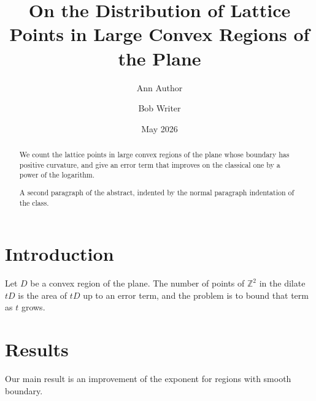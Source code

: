 \documentclass{amsart}
\begin{document}
\title{On the Distribution of Lattice Points in Large Convex Regions of the Plane}
\author{Ann Author}
\address{Department of Mathematics, Some University \\ Some City}
\author{Bob Writer}
\address{Institute for Advanced Things, a Very Long Name of an Institute That Goes On and On Past the End of a Line}
\date{May 2026}

\begin{abstract}
We count the lattice points in large convex regions of the plane whose boundary has positive curvature, and give an error term that improves on the classical one by a power of the logarithm.

A second paragraph of the abstract, indented by the normal paragraph indentation of the class.
\end{abstract}

\maketitle

\section{Introduction}
Let $D$ be a convex region of the plane. The number of points of $\mathbb{Z}^2$ in the dilate $tD$ is the area of $tD$ up to an error term, and the problem is to bound that term as $t$ grows.

\section{Results}
Our main result is an improvement of the exponent for regions with smooth boundary.
\end{document}

